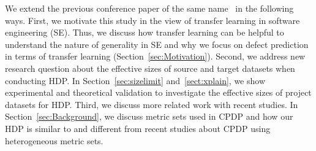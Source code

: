 We extend the previous conference paper of the same name~\cite{Nam15HDP} in the following ways. First, we motivate this study in the view of transfer learning in software engineering (SE). Thus, we discuss how transfer learning can be helpful to understand the nature of generality in SE and why we focus on defect prediction in terms of transfer learning (Section~\ref{sec:Motivation}). Second, we address new research question about the effective sizes of source and target datasets when conducting HDP.  In Section~\ref{sec:sizelimit} and~\ref{sect:xplain}, we show experimental and theoretical validation to investigate the effective sizes of project datasets for HDP. Third, we discuss more related work with recent studies. In Section~\ref{sec:Background}, we discuss metric sets used in CPDP and how our HDP is similar to and different from recent studies about CPDP using heterogeneous metric sets.

